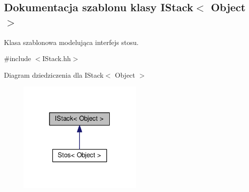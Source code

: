\hypertarget{class_i_stack}{\subsection{Dokumentacja szablonu klasy I\-Stack$<$ Object $>$}
\label{class_i_stack}
}


Klasa szablonowa modelująca interfejs stosu.  




{\ttfamily \#include $<$I\-Stack.\-hh$>$}



Diagram dziedziczenia dla I\-Stack$<$ Object $>$
\nopagebreak
\begin{figure}[H]
\begin{center}
\leavevmode
\includegraphics[width=172pt]{class_i_stack__inherit__graph}
\end{center}
\end{figure}
